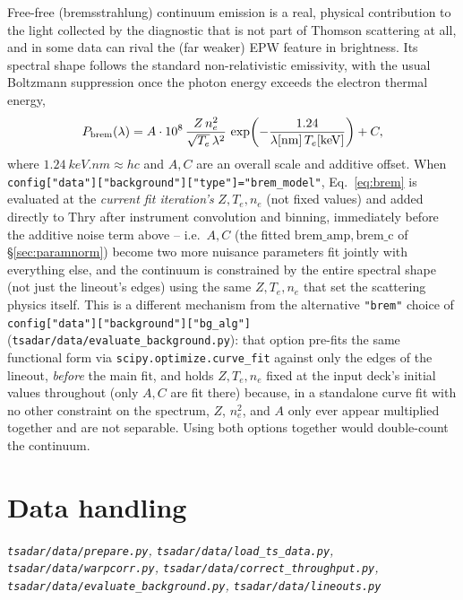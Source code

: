 \documentclass[11pt]{article}
\newcommand{\code}[1]{\texttt{#1}}
\newcommand{\file}[1]{\texttt{#1}}
\begin{document}
Free-free (bremsstrahlung) continuum emission is a real, physical contribution to the
light collected by the diagnostic that is not part of Thomson scattering at all, and in
some data can rival the (far weaker) EPW feature in brightness. Its spectral shape follows
the standard non-relativistic emissivity, with the usual Boltzmann suppression once the
photon energy exceeds the electron thermal energy,
\begin{equation}\label{eq:brem}
  P_{\rm brem}(\lambda) = A\cdot 10^{8}\,\frac{Z\,n_e^2}{\sqrt{T_e}\,\lambda^2}\,
  \exp\!\left(-\frac{1.24}{\lambda[\mathrm{nm}]\,T_e[\mathrm{keV}]}\right) + C,
\end{equation}
where $1.24\ \si{keV.nm}\approx hc$ and $A,C$ are an overall scale and additive offset. When
\code{config["data"]["background"]["type"]="brem\_model"}, Eq.~\ref{eq:brem} is evaluated
at the \emph{current fit iteration's} $Z,T_e,n_e$ (not fixed values) and added directly to
$\mathrm{Thry}$ after instrument convolution and binning, immediately before the additive
noise term above -- i.e.\ $A,C$ (the fitted $\mathrm{brem\_amp},\mathrm{brem\_c}$ of
\S\ref{sec:paramnorm}) become two more nuisance parameters fit jointly with everything
else, and the continuum is constrained by the entire spectral shape (not just the lineout's
edges) using the same $Z,T_e,n_e$ that set the scattering physics itself. This is a
different mechanism from the alternative \code{"brem"} choice of
\code{config["data"]["background"]["bg\_alg"]} (\file{tsadar/data/evaluate\_background.py}):
that option pre-fits the same functional form via \code{scipy.optimize.curve\_fit} against
only the edges of the lineout, \emph{before} the main fit, and holds $Z,T_e,n_e$ fixed at
the input deck's initial values throughout (only $A,C$ are fit there) because, in a
standalone curve fit with no other constraint on the spectrum, $Z$, $n_e^2$, and $A$ only
ever appear multiplied together and are not separable. Using both options together would
double-count the continuum.

\section{Data handling}\label{sec:data}
\textit{\file{tsadar/data/prepare.py}, \file{tsadar/data/load\_ts\_data.py},
\file{tsadar/data/warpcorr.py}, \file{tsadar/data/correct\_throughput.py},
\file{tsadar/data/evaluate\_background.py}, \file{tsadar/data/lineouts.py}}
\end{document}
